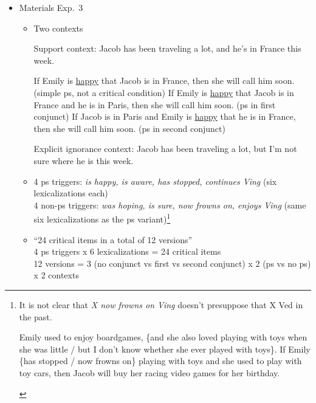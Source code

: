 \documentclass[11pt,fleqn]{article}
\newcommand{\6}{\mbox{$[\hspace*{-.6mm}[$}}
\newcommand{\9}{\mbox{$]\hspace*{-.6mm}]$}}
\begin{document}
\begin{itemize}
\begin{itemize}
\end{itemize}

\item Materials Exp.~3

\begin{itemize}

\item Two contexts

\begin{exe}
\ex 
\begin{xlist}
\ex Support context: Jacob has been traveling a lot, and he's in France this week.
\begin{xlist}
\ex If Emily is \underline{happy} that Jacob is in France, then she will call him soon. \hfill (simple ps, not a critical condition)
\ex If Emily is \underline{happy} that Jacob is in France and he is in Paris, then she will call him soon. \hfill (ps in first conjunct)
\ex If Jacob is in Paris and Emily is \underline{happy} that he is in France, then she will call him soon. \hfill (ps in second conjunct)
\end{xlist}

\ex Explicit ignorance context: Jacob has been traveling a lot, but I'm not sure where he is this week.

\end{xlist}
\end{exe}

\item 4 ps triggers: {\em is happy, is aware, has stopped, continues V{\em ing}} (six lexicalizations each)
\\ 4 non-ps triggers: {\em was hoping, is sure, now frowns on, enjoys V{\em ing}} (same six lexicalizations as the ps variant)\footnote{It is not clear that {\em X now frowns on Ving} doesn't presuppose that X Ved in the past. 
\begin{exe}
 Emily used to enjoy boardgames, \{and she also loved playing with toys when she was little / but I don't know whether she ever played with toys\}. If Emily \{has stopped / now frowns on\} playing with toys and she used to play with toy cars, then Jacob will buy her racing video games for her birthday.
\end{exe}
}

\item ``24 critical items in a total of 12 versions''
\\ 4 ps triggers x 6 lexicalizations = 24 critical items
\\ 12 versions = 3 (no conjunct vs first vs second conjunct) x 2 (ps vs no ps) x 2 contexts 


\end{itemize}
\end{itemize}
\end{document}
